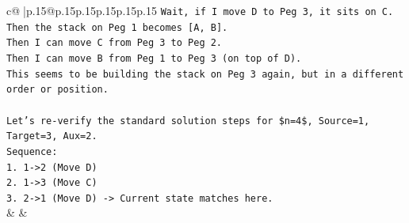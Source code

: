 \documentclass{article}
\begin{document}
{\begin{supertabular}{c@{$\;$}|p{.15\linewidth}@{}p{.15\linewidth}p{.15\linewidth}p{.15\linewidth}p{.15\linewidth}p{.15\linewidth}}
{{{\texttt{Wait, if I move D to Peg 3, it sits on C.} \\
\texttt{Then the stack on Peg 1 becomes {[}A, B{]}.} \\
\texttt{Then I can move C from Peg 3 to Peg 2.} \\
\texttt{Then I can move B from Peg 1 to Peg 3 (on top of D).} \\
\texttt{This seems to be building the stack on Peg 3 again, but in a different order or position.} \\
\\ 
\texttt{Let's re{-}verify the standard solution steps for \$n=4\$, Source=1, Target=3, Aux=2.} \\
\texttt{Sequence:} \\
\texttt{1. 1{-}>2 (Move D)} \\
\texttt{2. 1{-}>3 (Move C)} \\
\texttt{3. 2{-}>1 (Move D) {-}> Current state matches here.} \\
            }
        }
    }
    & & \\ \\


\end{supertabular}}
\end{document}

